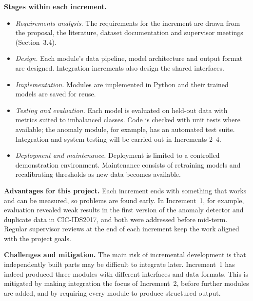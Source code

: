 \textbf{Stages within each increment.}
\begin{itemize}[itemsep=1pt, topsep=2pt]
  \item \textit{Requirements analysis.} The requirements for the increment are drawn from the proposal, the literature, dataset documentation and supervisor meetings (Section~3.4).
  \item \textit{Design.} Each module's data pipeline, model architecture and output format are designed. Integration increments also design the shared interfaces.
  \item \textit{Implementation.} Modules are implemented in Python and their trained models are saved for reuse.
  \item \textit{Testing and evaluation.} Each model is evaluated on held-out data with metrics suited to imbalanced classes. Code is checked with unit tests where available; the anomaly module, for example, has an automated test suite. Integration and system testing will be carried out in Increments 2--4.
  \item \textit{Deployment and maintenance.} Deployment is limited to a controlled demonstration environment. Maintenance consists of retraining models and recalibrating thresholds as new data becomes available.
\end{itemize}

\textbf{Advantages for this project.} Each increment ends with something that works and can be measured, so problems are found early. In Increment~1, for example, evaluation revealed weak results in the first version of the anomaly detector and duplicate data in CIC-IDS2017, and both were addressed before mid-term. Regular supervisor reviews at the end of each increment keep the work aligned with the project goals.

\textbf{Challenges and mitigation.} The main risk of incremental development is that independently built parts may be difficult to integrate later. Increment~1 has indeed produced three modules with different interfaces and data formats. This is mitigated by making integration the focus of Increment~2, before further modules are added, and by requiring every module to produce structured output.

